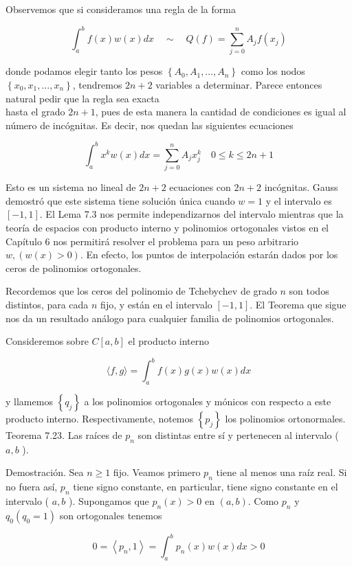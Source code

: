 \documentclass[10pt]{book}
\begin{document}
Observemos que si consideramos una regla de la forma

$$
\int_{a}^{b} f(x) w(x) d x \quad \sim \quad Q(f)=\sum_{j=0}^{n} A_{j} f\left(x_{j}\right)
$$

donde podamos elegir tanto los pesos $\left\{A_{0}, A_{1}, \ldots, A_{n}\right\}$ como los nodos $\left\{x_{0}, x_{1}, \ldots, x_{n}\right\}$, tendremos $2 n+2$ variables a determinar. Parece entonces natural pedir que la regla sea exacta\\
hasta el grado $2 n+1$, pues de esta manera la cantidad de condiciones es igual al número de incógnitas. Es decir, nos quedan las siguientes ecuaciones

$$
\int_{a}^{b} x^{k} w(x) d x=\sum_{j=0}^{n} A_{j} x_{j}^{k} \quad 0 \leq k \leq 2 n+1
$$

Esto es un sistema no lineal de $2 n+2$ ecuaciones con $2 n+2$ incógnitas. Gauss demostró que este sistema tiene solución única cuando $w=1$ y el intervalo es $[-1,1]$. El Lema 7.3 nos permite independizarnos del intervalo mientras que la teoría de espacios con producto interno y polinomios ortogonales vistos en el Capítulo 6 nos permitirá resolver el problema para un peso arbitrario $w,(w(x)>0)$. En efecto, los puntos de interpolación estarán dados por los ceros de polinomios ortogonales.

Recordemos que los ceros del polinomio de Tchebychev de grado $n$ son todos distintos, para cada $n$ fijo, y están en el intervalo $[-1,1]$. El Teorema que sigue nos da un resultado análogo para cualquier familia de polinomios ortogonales.

Consideremos sobre $C[a, b]$ el producto interno

$$
\langle f, g\rangle=\int_{a}^{b} f(x) g(x) w(x) d x
$$

y llamemos $\left\{q_{j}\right\}$ a los polinomios ortogonales y mónicos con respecto a este producto interno. Respectivamente, notemos $\left\{p_{j}\right\}$ los polinomios ortonormales.\\
Teorema 7.23. Las raíces de $p_{n}$ son distintas entre sí y pertenecen al intervalo ( $a, b$ ).

Demostración. Sea $n \geq 1$ fijo. Veamos primero $p_{n}$ tiene al menos una raíz real. Si no fuera así, $p_{n}$ tiene signo constante, en particular, tiene signo constante en el intervalo ( $a, b$ ). Supongamos que $p_{n}(x)>0$ en $(a, b)$. Como $p_{n}$ y $q_{0}\left(q_{0}=1\right)$ son ortogonales tenemos

$$
0=\left\langle p_{n}, 1\right\rangle=\int_{a}^{b} p_{n}(x) w(x) d x>0
$$
\end{document}
